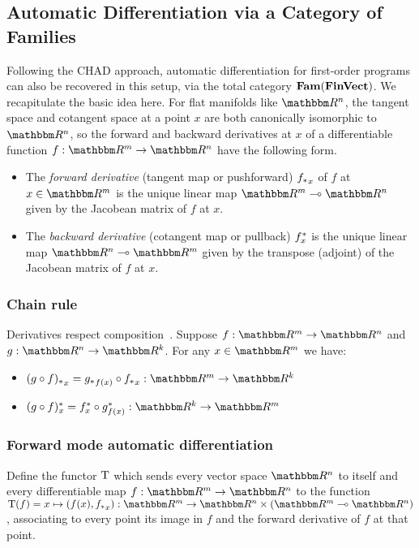 \subsection{Automatic Differentiation via a Category of Families}

Following the CHAD approach, automatic differentiation for first-order programs can also be recovered in this
setup, via the total category $\mathbf{Fam}(\mathbf{FinVect})$. We recapitulate the basic idea here. For flat manifolds like
$\RR^n$, the tangent space and cotangent space at a point $x$ are both canonically isomorphic to $\RR^n$, so
the forward and backward derivatives at $x$ of a differentiable function $f: \RR^m \to \RR^n$ have the
following form.

\begin{itemize}
\item The \emph{forward derivative} (tangent map or pushforward) ${f_{*}}_x$ of $f$ at $x \in \RR^m$ is the
unique linear map $\RR^m \linearto \RR^n$ given by the Jacobean matrix of $f$ at $x$.
\item The \emph{backward derivative} (cotangent map or pullback) $f^{*}_x$ is the unique linear map
$\RR^n \linearto \RR^m$ given by the transpose (adjoint) of the Jacobean matrix of $f$ at $x$.
\end{itemize}

\subsubsection{Chain rule}

Derivatives respect composition~\cite{spivak65}. Suppose $f: \RR^m \to \RR^n$ and $g: \RR^n \to \RR^k$. For
any $x \in \RR^m$ we have:

\begin{itemize}
\item $\pushf{(g \comp f)}_x = \pushf{g}_{f(x)} \comp \pushf{f}_x: \RR^m \to \RR^k$
\item $\pullf{(g \comp f)}_x = \pullf{f}_{x} \comp \pullf{g}_{f(x)}: \RR^k \to \RR^m$
\end{itemize}

\subsubsection{Forward mode automatic differentiation}

\begin{definition}
Define the functor $\mathrm{T}$ which sends every vector space $\RR^n$ to itself and every differentiable map
$f: \RR^m \to \RR^n$ to the function $\tangents(f) = x \mapsto (f(x), \pushf{f}_x): \RR^m \to \RR^n \times
(\RR^m \linearto \RR^n)$, associating to every point its image in $f$ and the forward derivative of $f$ at
that point.
\end{definition}

